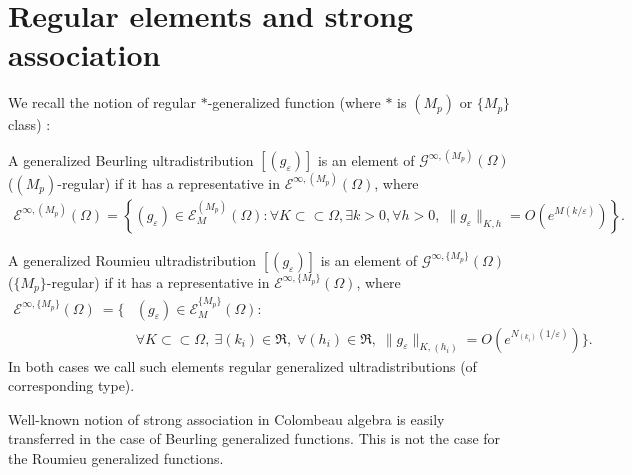 \documentclass[sn-mathphys,Numbered]{sn-jnl}%
\theoremstyle{thmstyleone}%
\theoremstyle{thmstyletwo}%
\newtheorem{remark}{Remark}%
\theoremstyle{thmstylethree}%
\begin{document}
 
 
 
 
\section{Regular elements and strong association}
\label{s3}

We recall the notion of regular $*$-generalized function (where $*$ is $(M_p)$ or $\{M_p\}$ class) \cite{D.V.1}:

A generalized Beurling ultradistribution $[(g_\varepsilon)]$ is an element of $\mathcal{G}^{\infty,(M_p)}(\Omega)$ ($(M_p)$-regular) if it has a representative in  $\mathcal{E}^{\infty,(M_p)}(\Omega)$, where
\begin{align*}
\mathcal{E}^{\infty,(M_p)}(\Omega) =\left\{(g_{\varepsilon}) \in \mathcal{E}^{(M_p)}_M (\Omega): \forall K \subset \subset \Omega,\exists k>0 ,  \forall h>0,\; \|g_{\varepsilon}\|_ {K,h} = O(e^{M({k}/{\varepsilon})})\right\}.
\end{align*}
 

A generalized Roumieu ultradistribution $[(g_\varepsilon)]$ is an element of $\mathcal{G}^{\infty,\{M_p\}}(\Omega)$ ($\{M_p\}$-regular) if it has a representative in  $\mathcal{E}^{\infty,\{M_p\}}(\Omega)$, where
\begin{align}
\mathcal{E}^{\infty,\{M_p\}}(\Omega)\ = \Big\{&(g_{\varepsilon}) \in \mathcal{E}_M^{\{M_p\}}(\Omega):\nonumber\\
&\label{RDo}
 \forall K \subset\subset \Omega,\   \exists (k_i) \in \mathfrak{R},\;  \forall (h_i) \in \mathfrak{R}, \; \|g_{\varepsilon}\|_ {K,(h_i)} = O(e^{N_{(k_i)}(1/\varepsilon)}) \Big\}.
\end{align}
In both cases we call such elements regular generalized ultradistributions (of corresponding type).

Well-known notion of strong association in Colombeau algebra is easily transferred in the case of Beurling generalized functions. This is not the case for the Roumieu generalized functions.
\end{document}
